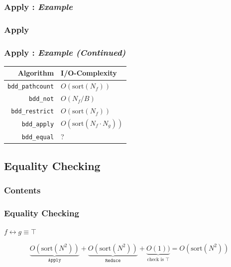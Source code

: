 \documentclass[english, aspectratio=169]{beamer}
\newcommand{\sort}[0]{\text{sort}}
\begin{document}
\begin{frame}
  \frametitle{Apply : \emph{Example}}


  
\end{frame}

\begin{frame}
  \frametitle{Apply}


  
\end{frame}

\begin{frame}
  \frametitle{Apply : \emph{Example {\tiny(Continued)}}}

  
\end{frame}

\begin{frame}
  \begin{table}
    \centering
    \begin{tabular}{rl}
      Algorithm                 & I/O-Complexity
      \\ \hline \hline
      \lstinline{bdd_pathcount} & $O(\sort(N_f))$
      \\ \hline
      \lstinline{bdd_not}       & $O(N_f / B)$
      \\
      \lstinline{bdd_restrict}  & $O(\sort(N_f))$
      \\
      \lstinline{bdd_apply}     & $O(\sort(N_f \cdot N_g))$
      \pause
      \\ \hline
      \lstinline{bdd_equal}     & ?
    \end{tabular}
  \end{table}
\end{frame}

\subsection{Equality Checking}

\begin{frame}{}
  \frametitle{Contents}
\end{frame}

\begin{frame}
  \frametitle{Equality Checking}

  \vspace{30pt}
  \begin{center}
    {\huge $f \leftrightarrow g \equiv \top$}
  \end{center}

  \pause
  \vspace{20pt}

  \begin{equation*}
    \underbrace{O(\sort(N^2))}_{\texttt{Apply}}
    + \underbrace{O(\sort(N^2))}_{\texttt{Reduce}}
    + \underbrace{O(1))}_{\text{check is } \top}
    = O(\sort(N^2))
  \end{equation*}
\end{frame}
\end{document}
